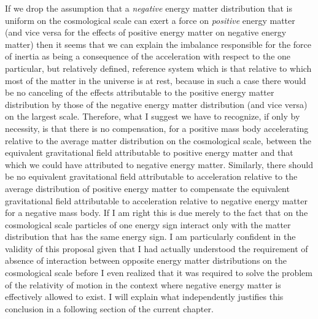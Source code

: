 \documentclass[notitlepage,12pt]{report}
\begin{document}
If we drop the assumption that a \textit{negative} energy matter distribution that is uniform on the cosmological scale can exert a force on \textit{positive} energy matter (and vice versa for the effects of positive energy matter on negative energy matter) then it seems that we can explain the imbalance responsible for the force of inertia as being a consequence of the acceleration with respect to the one particular, but relatively defined, reference system which is that relative to which most of the matter in the universe is at rest, because in such a case there would be no canceling of the effects attributable to the positive energy matter distribution by those of the negative energy matter distribution (and vice versa) on the largest scale. Therefore, what I suggest we have to recognize, if only by necessity, is that there is no compensation, for a positive mass body accelerating relative to the average matter distribution on the cosmological scale, between the equivalent gravitational field attributable to positive energy matter and that which we could have attributed to negative energy matter. Similarly, there should be no equivalent gravitational field attributable to acceleration relative to the average distribution of positive energy matter to compensate the equivalent gravitational field attributable to acceleration relative to negative energy matter for a negative mass body. If I am right this is due merely to the fact that on the cosmological scale particles of one energy sign interact only with the matter distribution that has the same energy sign. I am particularly confident in the validity of this proposal given that I had actually understood the requirement of absence of interaction between opposite energy matter distributions on the cosmological scale before I even realized that it was required to solve the problem of the relativity of motion in the context where negative energy matter is effectively allowed to exist. I will explain what independently justifies this conclusion in a following section of the current chapter.
\end{document}
